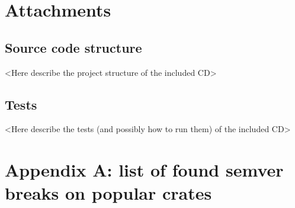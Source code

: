 \documentclass[licencjacka,en]{pracamgr}
\begin{document}

\chapter*{Attachments}

\section*{Source code structure}

<Here describe the project structure of the included CD>


\section*{Tests}

<Here describe the tests (and possibly how to run them) of the included CD>

\chapter*{Appendix A: list of found semver breaks on popular crates}
\end{document}
